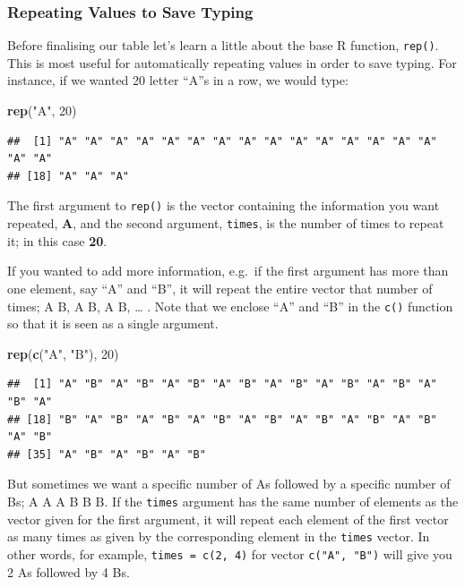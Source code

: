 \documentclass[]{book}
\newenvironment{Shaded}{\begin{snugshade}}{\end{snugshade}}
\newcommand{\DecValTok}[1]{\textcolor[rgb]{0.00,0.00,0.81}{#1}}
\newcommand{\KeywordTok}[1]{\textcolor[rgb]{0.13,0.29,0.53}{\textbf{#1}}}
\newcommand{\NormalTok}[1]{#1}
\newcommand{\StringTok}[1]{\textcolor[rgb]{0.31,0.60,0.02}{#1}}
\begin{document}
\hypertarget{repeating-values-to-save-typing}{%
\subsubsection{Repeating Values to Save Typing}\label{repeating-values-to-save-typing}}

Before finalising our table let's learn a little about the base R function, \texttt{rep()}. This is most useful for automatically repeating values in order to save typing. For instance, if we wanted 20 letter ``A''s in a row, we would type:

\begin{Shaded}
\begin{Highlighting}[]
\KeywordTok{rep}\NormalTok{(}\StringTok{"A"}\NormalTok{, }\DecValTok{20}\NormalTok{)}
\end{Highlighting}
\end{Shaded}

\begin{verbatim}
##  [1] "A" "A" "A" "A" "A" "A" "A" "A" "A" "A" "A" "A" "A" "A" "A" "A" "A"
## [18] "A" "A" "A"
\end{verbatim}

The first argument to \texttt{rep()} is the vector containing the information you want repeated, \textbf{A}, and the second argument, \texttt{times}, is the number of times to repeat it; in this case \textbf{20}.

If you wanted to add more information, e.g.~if the first argument has more than one element, say ``A'' and ``B'', it will repeat the entire vector that number of times; A B, A B, A B, \ldots{} . Note that we enclose ``A'' and ``B'' in the \texttt{c()} function so that it is seen as a single argument.

\begin{Shaded}
\begin{Highlighting}[]
\KeywordTok{rep}\NormalTok{(}\KeywordTok{c}\NormalTok{(}\StringTok{"A"}\NormalTok{, }\StringTok{"B"}\NormalTok{), }\DecValTok{20}\NormalTok{)}
\end{Highlighting}
\end{Shaded}

\begin{verbatim}
##  [1] "A" "B" "A" "B" "A" "B" "A" "B" "A" "B" "A" "B" "A" "B" "A" "B" "A"
## [18] "B" "A" "B" "A" "B" "A" "B" "A" "B" "A" "B" "A" "B" "A" "B" "A" "B"
## [35] "A" "B" "A" "B" "A" "B"
\end{verbatim}

But sometimes we want a specific number of As followed by a specific number of Bs; A A A B B B. If the \texttt{times} argument has the same number of elements as the vector given for the first argument, it will repeat each element of the first vector as many times as given by the corresponding element in the \texttt{times} vector. In other words, for example, \texttt{times\ =\ c(2,\ 4)} for vector \texttt{c("A",\ "B")} will give you 2 As followed by 4 Bs.
\end{document}
